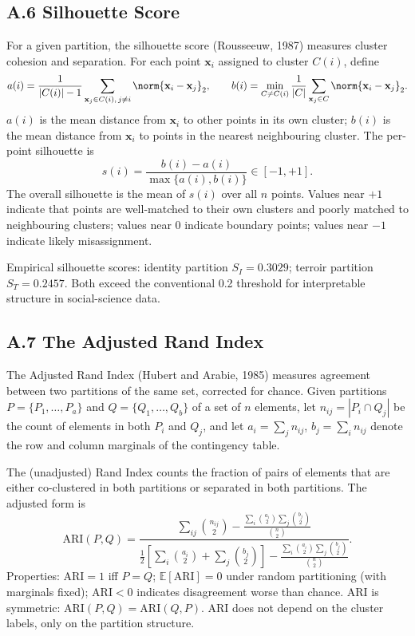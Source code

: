 \documentclass[11pt]{article}
\begin{document}
\subsection*{A.6 Silhouette Score}
For a given partition, the silhouette score (Rousseeuw, 1987) measures cluster cohesion and separation. For each point $\mathbf{x}_i$ assigned to cluster $C(i)$, define
\[
a(i) = \frac{1}{|C(i)| - 1} \sum_{\mathbf{x}_j \in C(i),\, j \neq i} \norm{\mathbf{x}_i - \mathbf{x}_j}_2,
\qquad
b(i) = \min_{C \neq C(i)} \frac{1}{|C|} \sum_{\mathbf{x}_j \in C} \norm{\mathbf{x}_i - \mathbf{x}_j}_2.
\]
$a(i)$ is the mean distance from $\mathbf{x}_i$ to other points in its own cluster; $b(i)$ is the mean distance from $\mathbf{x}_i$ to points in the nearest neighbouring cluster. The per-point silhouette is
\[
s(i) = \frac{b(i) - a(i)}{\max\{a(i), b(i)\}} \in [-1, +1].
\]
The overall silhouette is the mean of $s(i)$ over all $n$ points. Values near $+1$ indicate that points are well-matched to their own clusters and poorly matched to neighbouring clusters; values near $0$ indicate boundary points; values near $-1$ indicate likely misassignment.

Empirical silhouette scores: identity partition $S_I = 0.3029$; terroir partition $S_T = 0.2457$. Both exceed the conventional 0.2 threshold for interpretable structure in social-science data.

\subsection*{A.7 The Adjusted Rand Index}
The Adjusted Rand Index (Hubert and Arabie, 1985) measures agreement between two partitions of the same set, corrected for chance. Given partitions $P = \{P_1, \ldots, P_a\}$ and $Q = \{Q_1, \ldots, Q_b\}$ of a set of $n$ elements, let $n_{ij} = |P_i \cap Q_j|$ be the count of elements in both $P_i$ and $Q_j$, and let $a_i = \sum_j n_{ij}$, $b_j = \sum_i n_{ij}$ denote the row and column marginals of the contingency table.

The (unadjusted) Rand Index counts the fraction of pairs of elements that are either co-clustered in both partitions or separated in both partitions. The adjusted form is
\[
\mathrm{ARI}(P, Q) = \frac{\displaystyle \sum_{ij} \binom{n_{ij}}{2} - \frac{\sum_i \binom{a_i}{2} \sum_j \binom{b_j}{2}}{\binom{n}{2}}}{\displaystyle \frac{1}{2}\!\left[\sum_i \binom{a_i}{2} + \sum_j \binom{b_j}{2}\right] - \frac{\sum_i \binom{a_i}{2} \sum_j \binom{b_j}{2}}{\binom{n}{2}}}.
\]
Properties: $\mathrm{ARI} = 1$ iff $P = Q$; $\mathbb{E}[\mathrm{ARI}] = 0$ under random partitioning (with marginals fixed); $\mathrm{ARI} < 0$ indicates disagreement worse than chance. ARI is symmetric: $\mathrm{ARI}(P, Q) = \mathrm{ARI}(Q, P)$. ARI does not depend on the cluster labels, only on the partition structure.
\end{document}
